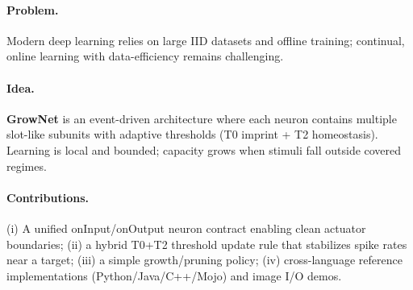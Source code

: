 \paragraph{Problem.} Modern deep learning relies on large IID datasets and offline training; continual, online learning with data-efficiency remains challenging.

\paragraph{Idea.} \textbf{GrowNet} is an event-driven architecture where each neuron contains multiple slot-like subunits with adaptive thresholds (T0 imprint + T2 homeostasis). Learning is local and bounded; capacity grows when stimuli fall outside covered regimes.

\paragraph{Contributions.} (i) A unified onInput/onOutput neuron contract enabling clean actuator boundaries; (ii) a hybrid T0+T2 threshold update rule that stabilizes spike rates near a target; (iii) a simple growth/pruning policy; (iv) cross-language reference implementations (Python/Java/C++/Mojo) and image I/O demos.